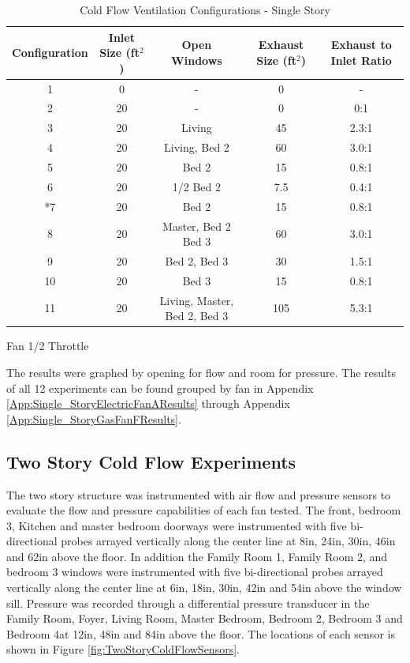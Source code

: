 \documentclass{article}
\begin{document}
\begin{table} [H]
	\caption{Cold Flow Ventilation Configurations - Single Story}
	\begin{tabular}{|c|c|c|c|c|}
		\hline
		Configuration & Inlet Size (ft$^2$) & Open Windows & Exhaust Size (ft$^2$) & Exhaust to Inlet Ratio \\ \hline \hline
		1 & 0 & - & 0 & - \\ \hline
		2 & 20 & - & 0 & 0:1 \\ \hline
		3 & 20 & Living & 45 & 2.3:1 \\ \hline
		4 & 20 & Living, Bed 2 & 60 & 3.0:1 \\ \hline
		5 & 20 & Bed 2 & 15 & 0.8:1 \\ \hline
		6 & 20 & 1/2 Bed 2 & 7.5 & 0.4:1 \\ \hline
		*7 & 20 & Bed 2 & 15 & 0.8:1 \\ \hline
		8 & 20 & Master, Bed 2 Bed 3 & 60 & 3.0:1 \\ \hline
		9 & 20 & Bed 2, Bed 3 & 30 & 1.5:1 \\ \hline
		10 & 20 & Bed 3 & 15 & 0.8:1 \\ \hline
		11 & 20 & Living, Master, Bed 2, Bed 3 & 105 & 5.3:1 \\ \hline
	\end{tabular}
	\begin{tablenotes}
		\item *Fan 1/2 Throttle
	\end{tablenotes}
	\label{tab:ColdFlowConfig_SingleStory}
\end{table}


The results were graphed by opening for flow and room for pressure. The results of all 12 experiments can be found grouped by fan in Appendix \ref{App:Single_StoryElectricFanAResults} through Appendix \ref{App:Single_StoryGasFanFResults}. 

\subsection{Two Story Cold Flow Experiments}
The two story structure was instrumented with air flow and pressure sensors to evaluate the flow and pressure capabilities of each fan tested. The front, bedroom 3, Kitchen and master bedroom doorways were instrumented with five bi-directional probes arrayed vertically along the center line at 8in, 24in, 30in, 46in and 62in above the floor. In addition the Family Room 1, Family Room 2, and bedroom 3 windows were instrumented with five bi-directional probes arrayed vertically along the center line at 6in, 18in, 30in, 42in and 54in above the window sill. Pressure was recorded through a differential pressure transducer in the Family Room, Foyer, Living Room, Master Bedroom, Bedroom 2, Bedroom 3 and Bedroom 4at 12in, 48in and 84in above the floor. The locations of each sensor is shown in Figure \ref{fig:TwoStoryColdFlowSensors}. 
\end{document}
